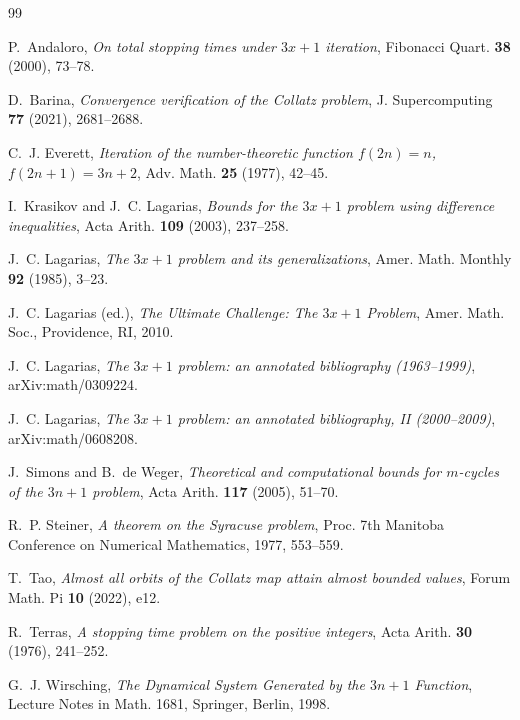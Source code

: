 \documentclass[11pt]{article}
\theoremstyle{definition}
\theoremstyle{remark}
\begin{document}
\begin{thebibliography}{99}

P.~Andaloro,
\emph{On total stopping times under $3x+1$ iteration},
Fibonacci Quart. \textbf{38} (2000), 73--78.

D.~Barina,
\emph{Convergence verification of the Collatz problem},
J. Supercomputing \textbf{77} (2021), 2681--2688.

C.~J. Everett,
\emph{Iteration of the number-theoretic function $f(2n)=n$,
$f(2n+1)=3n+2$},
Adv. Math. \textbf{25} (1977), 42--45.

I.~Krasikov and J.~C. Lagarias,
\emph{Bounds for the $3x+1$ problem using difference inequalities},
Acta Arith. \textbf{109} (2003), 237--258.

J.~C. Lagarias,
\emph{The $3x+1$ problem and its generalizations},
Amer. Math. Monthly \textbf{92} (1985), 3--23.

J.~C. Lagarias (ed.),
\emph{The Ultimate Challenge: The $3x+1$ Problem},
Amer. Math. Soc., Providence, RI, 2010.

J.~C. Lagarias,
\emph{The $3x+1$ problem: an annotated bibliography (1963--1999)},
arXiv:math/0309224.

J.~C. Lagarias,
\emph{The $3x+1$ problem: an annotated bibliography, II (2000--2009)},
arXiv:math/0608208.

J.~Simons and B.~de Weger,
\emph{Theoretical and computational bounds for $m$-cycles of the $3n+1$
problem},
Acta Arith. \textbf{117} (2005), 51--70.

R.~P. Steiner,
\emph{A theorem on the Syracuse problem},
Proc. 7th Manitoba Conference on Numerical Mathematics, 1977,
553--559.

T.~Tao,
\emph{Almost all orbits of the Collatz map attain almost bounded
values},
Forum Math. Pi \textbf{10} (2022), e12.

R.~Terras,
\emph{A stopping time problem on the positive integers},
Acta Arith. \textbf{30} (1976), 241--252.

G.~J. Wirsching,
\emph{The Dynamical System Generated by the $3n+1$ Function},
Lecture Notes in Math. 1681, Springer, Berlin, 1998.

\end{thebibliography}
\end{document}
